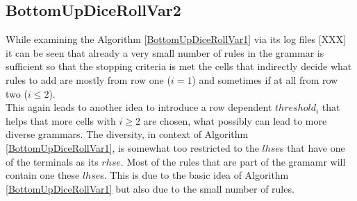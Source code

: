 \noindent
{}

\pagebreak
\subsection{BottomUpDiceRollVar2}
While examining the Algorithm \ref{BottomUpDiceRollVar1} via its log files [XXX] it can be seen that already a very small number of rules in the grammar is sufficient so that the stopping criteria  is met \textendash the cells that indirectly decide what rules to add are mostly from row one ($i=1$) and sometimes if at all from row two ($i\leq2$).\\ 
This again leads to another idea to introduce a row dependent $threshold_i$ that helps that more cells with $i\geq2$ are chosen, what possibly can lead to more diverse grammars. The diversity, in context of Algorithm \ref{BottomUpDiceRollVar1}, is somewhat too restricted to the $lhse$s that have one of the terminals as its $rhse$. Most of the rules that are part of the gramamr will contain one these $lhse$s. This is due to the basic idea of Algorithm \ref{BottomUpDiceRollVar1} but also due to the small number of rules. \\

